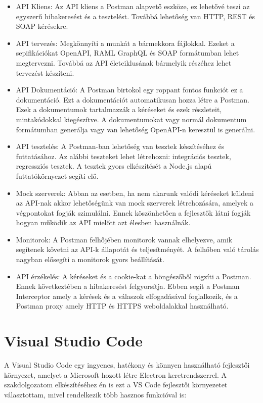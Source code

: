\begin{itemize}
    \item API Kliens: Az API kliens a Postman alapvető eszköze, ez lehetővé teszi az egyszerű hibakeresést és a tesztelést. Továbbá lehetőség van HTTP, REST és SOAP kérésekre.
    \item API tervezés: Megkönnyíti a munkát a bármekkora fájlokkal. Ezeket a sepifikációkat OpenAPI, RAML GraphQL és SOAP formátumban lehet megtervezni. Továbbá az API életciklusának bármelyik részéhez lehet tervezést készíteni.
    \item API Dokumentáció: A Postman birtokol egy roppant fontos funkciót ez a dokumentáció. Ezt a dokumentációt automatikusan hozza létre a Postman. Ezek a dokumentumok tartalmazzák a kéréseket és ezek részleteit, mintakódokkal kiegészítve. A dokumentumokat vagy normál dokumentum formátumban generálja vagy van lehetőség OpenAPI-n keresztül is generálni.
    \item API tesztelés: A Postman-ban lehetőség van tesztek készítéséhez és futtatásához. Az alábbi teszteket lehet létrehozni: integrációs tesztek, regressziós tesztek. A tesztek gyors elkészítését a Node.js alapú futtatókörnyezet segíti elő.
    \item Mock szerverek: Abban az esetben, ha nem akarunk valódi kéréseket küldeni az API-nak akkor lehetőségünk van mock szerverek létrehozására, amelyek a végpontokat fogják szimulálni. Ennek köszönhetően a fejlesztők látni fogják hogyan működik az API mielőtt azt élesben használnák.
    \item Monitorok: A Postman felhőjében monitorok vannak elhelyezve, amik segítenek követni az API-k állapotát és teljesítményét. A felhőben való tárolás nagyban elősegíti a monitorok gyors beállítását.
    \item API érzékelés: A kéréseket és a cookie-kat a böngészőből rögzíti a Postman. Ennek következtében a hibakeresést felgyorsítja. Ebben segít a Postman Interceptor amely a kérések és a válaszok elfogadásával foglalkozik, és a Postman proxy amely HTTP és HTTPS weboldalakkal használható.
\end{itemize}

\section{Visual Studio Code}
A Visual Studio Code \cite{19} egy ingyenes, hatékony és könnyen használható fejlesztői környezet, amelyet a Microsoft hozott létre Electron keretrendszerrel. A szakdolgozatom elkészítéséhez én is ezt a VS Code fejlesztői környezetet választottam, mivel rendelkezik több hasznos funkcióval is:

